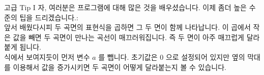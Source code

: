 \begin{surferPage}{고급 Tip I}
자, 여러분은 프로그램에 대해 많은 것을 배우셨습니다. 이제 좀더 높은 수준의 팁을 드리겠습니다.:\\
\vspace{0.3cm}
앞서 배웠다시피 두 곡면의 표현식을 곱하면 그 두 면이 함께 나타납니다. 이 곱에서 작은 값을 빼면 두 곡면이 만나는 곡선이 매끄러워집니다. 즉 두 면이 아주 매끄럽게 달라붙게 됩니다. \\
\vspace{0.3cm}
식에서 보여지듯이 먼저 변수 $a$ 를 뺍니다. 초기값은 $0$ 으로 설정되어 있지만 옆의 막대를 이용해서 값을 증가시키면 두 곡면이 어떻게 달라붙는지 볼 수 있습니다.
\end{surferPage}

